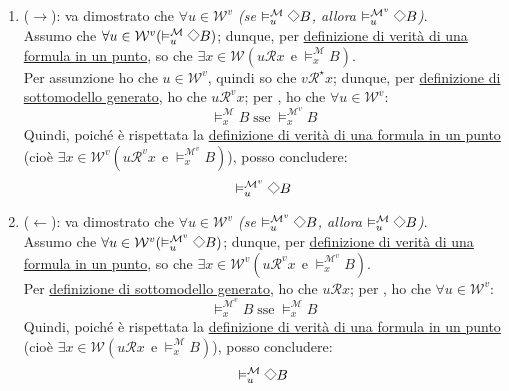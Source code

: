 \documentclass[a4paper,12pt]{article}
\newcommand{\latinmath}[1]{\text{\latinmodern{#1}}} %
\newcommand{\Dmd}{\mathord{\vcenter{\hbox{\tikz[baseline=-0.6ex]{\draw[line width=0.4pt, scale=1, rotate=45] (0,0) rectangle (0.2,0.2);}}}}} %
\begin{document}
\begin{dimo}
\begin{description}
\begin{itemize}
			\begin{enumerate}
				\item ($\to$): va dimostrato che \emph{$\forall u \in \mathcal{W}^{v}$ (se $\vDash_u^{\mathcal{M}} \Dmd B$, allora $\vDash_u^{\mathcal{M}^{v}} \Dmd B$)}. \\
				Assumo che $\forall u \in \mathcal{W}^{v} (\vDash_u^{\mathcal{M}} \Dmd B)$; dunque, per \hyperlink{defverp}{definizione di verità di una formula in un punto}, so che $\exists x \in \mathcal{W} (u\mathcal{R}x \;\, \text{e} \; \vDash_x^{\mathcal{M}} B)$. \\
				Per assunzione ho che $u \in \mathcal{W}^{v}$, quindi so che $v\mathcal{R}^{\star}x$; dunque, per \hyperlink{modgen}{definizione di sottomodello generato}, ho che $u\mathcal{R}^{v}x$; per \latinmath{IH1}, ho che $\forall u \in \mathcal{W}^{v}$:
				$$\vDash_x^{\mathcal{M}} B\; \text{sse} \; \vDash_x^{\mathcal{M}^{v}} B$$
				Quindi, poiché è rispettata la \hyperlink{defverp}{definizione di verità di una formula in un punto} (cioè $\exists x \in \mathcal{W}^{v}(u\mathcal{R}^{v}x \;\, \text{e} \; \vDash_x^{\mathcal{M}^{v}} B)$), posso concludere:
				$$\vDash_u^{\mathcal{M}^{v}} \Dmd B$$
				\item ($\leftarrow$): va dimostrato che \emph{$\forall u \in \mathcal{W}^{v}$ (se $\vDash_u^{\mathcal{M}^{v}} \Dmd B$, allora $\vDash_u^{\mathcal{M}} \Dmd B$)}. \\
				Assumo che $\forall u \in \mathcal{W}^{v} (\vDash_u^{\mathcal{M}^{v}} \Dmd B)$; dunque, per \hyperlink{defverp}{definizione di verità di una formula in un punto}, so che $\exists x \in \mathcal{W}^{v} (u\mathcal{R}^{v}x \;\, \text{e} \; \vDash_x^{\mathcal{M}^{v}} B)$. \\
				Per \hyperlink{modgen}{definizione di sottomodello generato}, ho che $u\mathcal{R}x$; per \latinmath{IH1}, ho che $\forall u \in \mathcal{W}^{v}$:
				$$\vDash_x^{\mathcal{M}^{v}} B\; \text{sse} \; \vDash_x^{\mathcal{M}} B$$
				Quindi, poiché è rispettata la \hyperlink{defverp}{definizione di verità di una formula in un punto} (cioè $\exists x \in \mathcal{W}(u\mathcal{R}x \;\, \text{e} \; \vDash_x^{\mathcal{M}} B)$), posso concludere: 
				$$\vDash_u^{\mathcal{M}} \Dmd B$$
			\end{enumerate}
		\end{itemize}
	\end{description}
\end{dimo}
\end{document}

